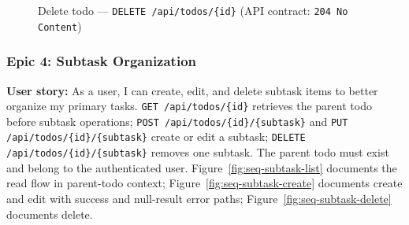 \begin{figure}[htbp]
  \centering
  \caption{Delete todo --- \texttt{DELETE /api/todos/\{id\}} (API contract: \texttt{204 No Content})}
  \label{fig:seq-todo-delete}
\end{figure}


\newpage


\subsubsection{Epic 4: Subtask Organization}
\textbf{User story:} As a user, I can create, edit, and delete subtask items to better organize my primary tasks.
\newline
\texttt{GET /api/todos/\{id\}} retrieves the parent todo before subtask operations;
\texttt{POST /api/todos/\{id\}/\{subtask\}} and \texttt{PUT /api/todos/\{id\}/\{subtask\}} create or edit
a subtask; \texttt{DELETE /api/todos/\{id\}/\{subtask\}} removes one subtask. The parent todo must
exist and belong to the authenticated user.
Figure~\ref{fig:seq-subtask-list} documents the read flow in parent-todo context;
Figure~\ref{fig:seq-subtask-create} documents create and edit with success and null-result error paths;
Figure~\ref{fig:seq-subtask-delete} documents delete.

